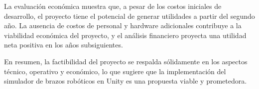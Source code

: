 La evaluación económica muestra que, a pesar de los costos iniciales de desarrollo, el proyecto tiene el potencial de generar utilidades a partir del segundo año. La ausencia de costos de personal y hardware adicionales contribuye a la viabilidad económica del proyecto, y el análisis financiero proyecta una utilidad neta positiva en los años subsiguientes.

En resumen, la factibilidad del proyecto se respalda sólidamente en los aspectos técnico, operativo y económico, lo que sugiere que la implementación del simulador de brazos robóticos en Unity es una propuesta viable y prometedora.